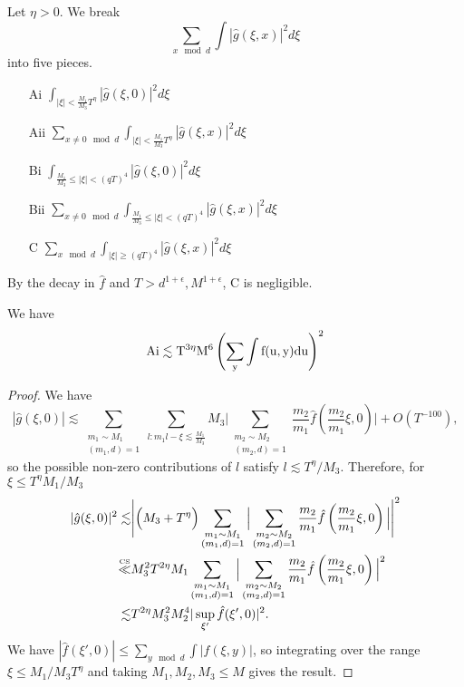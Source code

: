 Let $\eta>0$. We break \[
\sum_{x\mod d} \int |\hat{g}(\xi,x)|^2 d\xi
\]
into five pieces. \begin{enumerate}
    \item [Ai] $\int_{|\xi|<\frac{M_1}{M_3}T^\eta} |\hat{g}(\xi,0)|^2 d\xi$
    \item [Aii]$\sum_{x\neq 0 \mod d}\int_{|\xi|<\frac{M_1}{M_3}T^\eta} |\hat{g}(\xi,x)|^2 d\xi$
    \item [Bi] $\int_{\frac{M_1}{M_3}\leq|\xi|<(qT)^4} |\hat{g}(\xi,0)|^2 d\xi$
    \item [Bii]$\sum_{x\neq 0 \mod d}\int_{\frac{M_1}{M_3}\leq|\xi|<(qT)^4} |\hat{g}(\xi,x)|^2 d\xi$
    \item [C]  $\sum_{x \mod d}\int_{|\xi|\geq (qT)^4} |\hat{g}(\xi,x)|^2 d\xi$
\end{enumerate}
By the decay in $\hat{f}$ and $T>d^{1+\epsilon}, M^{1+\epsilon}$, C is negligible. 

\begin{lemma}[Ai bound]\label{affinemainterm}
    We have \[
    \rm{Ai} \lesssim T^{3\eta}M^6\left(\sum_y \int f(u,y) du\right)^2
    \]
\end{lemma}
\begin{proof}
    We have
    \[
        |\hat{g}(\xi,0)|\lesssim 
        \sum_{\substack{m_1\sim M_1\\(m_1,d)=1}} 
        \sum_{l : m_1l- \xi \lesssim \frac{M_1}{M_3} }M_3\Bigg|
        \sum_{\substack{m_2\sim M_2\\(m_2,d)=1}} \frac{m_2}{m_1}\hat{f}\left(\frac{m_2}{m_1}\xi, 0\right) 
        \Bigg|+ O(T^{-100}),
    \]
    so the possible non-zero contributions of $l$ satisfy $l\lesssim T^\eta/M_3$. Therefore, for $\xi\leq T^\eta M_1/M_3$\begin{align*}
    |\hat{g}(\xi,0)|^2 \lesssim& \Bigg|\Big(M_3+T^\eta\Big)\sum_{\substack{m_1\sim M_1\\(m_1,d)=1}} 
    \Big|
        \sum_{\substack{m_2\sim M_2\\(m_2,d)=1}} \frac{m_2}{m_1}\hat{f}\left(\frac{m_2}{m_1}\xi, 0\right) 
        \Big| \Bigg|^2\\
        \stackon{CS}{\ll}& M_3^2T^{2\eta} M_1\sum_{\substack{m_1\sim M_1\\(m_1,d)=1}} 
        \Big|\sum_{\substack{m_2\sim M_2\\(m_2,d)=1}} \frac{m_2}{m_1}\hat{f}\left(\frac{m_2}{m_1}\xi, 0\right) \Big|^2\\
        \lesssim & T^{2\eta}M_3^2M_2^4 |\sup_{\xi'} \hat{f}(\xi',0)|^2.
    \end{align*}
    We have $|\hat{f}(\xi',0)|\leq \sum_{y\mod d}\int |f(\xi,y)|$,
    so integrating over the range $\xi\leq M_1/M_3 T^\eta$ and taking $M_1,M_2,M_3\leq M$ gives the result.
\end{proof}



